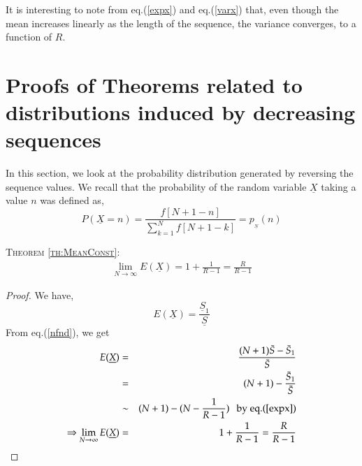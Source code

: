 \begin{multicols}{2}
It is interesting to note from eq.(\ref{expx}) and eq.(\ref{varx}) that, even though the mean increases linearly as the length of the sequence, the variance converges, to a function of $R$.

\section{Proofs of Theorems related to distributions induced by decreasing sequences}\label{section-7}

In this section, we look at the probability distribution generated by reversing the sequence values. We recall that the probability of the random variable $\underline{X}$ taking a value $n$ was defined as, 
\begin{equation}
P(\underline{X} = n) =\frac{f[N+1-n]}{\displaystyle{\sum_{k=1}^{N}f[N+1-k]}} = p_{_{\underline{N}}}(n)\label{eq-7.1}
\end{equation}

\textsc{Theorem {\ref{th:MeanConst}}:}
\begin{eqnarray*}
\displaystyle{\lim_{N \rightarrow \infty}}E(\underline{X}) = 1 + \displaystyle{\frac{1}{R-1}} =  \displaystyle{\frac{R}{R-1}}
\end{eqnarray*}

\begin{proof}\renewcommand{\qedsymbol}{}
We have,
\begin{equation}
E(\underline{X}) = \frac{\underline{S}_1}{\underline{S}}
\end{equation}
From eq.(\ref{nfnd}), we get
\begin{eqnarray}
E(\underline{X}) &=& \frac{(N+1)\bar{S} - \bar{S}_1}{\bar{S}}\nonumber\\
&=& (N+1) - \frac{\bar{S}_1}{\bar{S}}\nonumber\\
&\sim& (N+1) - (N - \frac{1}{R-1}) \hspace{0.1in}\textup{by eq.(\ref{expx}})\nonumber\\
\label{meand}\Rightarrow  \lim_{N\rightarrow \infty}E(\underline{X}) &=& 1 + \displaystyle{\frac{1}{R-1}} = \displaystyle{\frac{R}{R-1}}
\end{eqnarray}
\end{proof}


\end{multicols}
